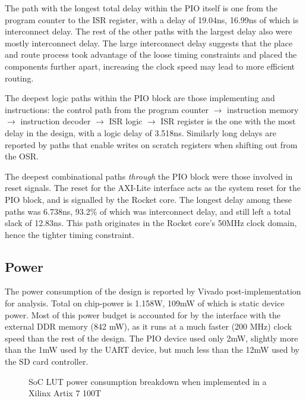 The path with the longest total delay within the PIO itself is one from the program counter to the ISR register, with a delay of 19.04ns, 16.99ns of which is interconnect delay. The rest of the other paths with the largest delay also were mostly interconnect delay. The large interconnect delay suggests that the place and route process took advantage of the loose timing constraints and placed the components further apart, increasing the clock speed may lead to more efficient routing.

The deepest logic paths within the PIO block are those implementing  and  instructions: the control path from the program counter $\rightarrow$ instruction memory $\rightarrow$ instruction decoder $\rightarrow$ ISR logic $\rightarrow$ ISR register is the one with the most delay in the design, with a logic delay of 3.518ns. Similarly long delays are reported by paths that enable writes on scratch registers when shifting out from the OSR.

The deepest combinational paths \textit{through} the PIO block were those involved in reset signals. The reset for the AXI-Lite interface acts as the system reset for the PIO block, and is signalled by the Rocket core. The longest delay among these paths was 6.738ns, 93.2\% of which was interconnect delay, and still left a total slack of 12.83ns. This path originates in the Rocket core's 50MHz clock domain, hence the tighter timing constraint.

\subsection{Power}

The power consumption of the design is reported by Vivado post-implementation for analysis. Total on chip-power is 1.158W, 109mW of which is static device power. Most of this power budget is accounted for by the interface with the external DDR memory (842 mW), as it runs at a much faster (200 MHz) clock speed than the rest of the design. The PIO device used only 2mW, slightly more than the 1mW used by the UART device, but much less than the 12mW used by the SD card controller.

\begin{figure}[H]
    \centering
    \caption{SoC LUT power consumption breakdown when implemented in a Xilinx Artix 7 100T}
    \label{fig:pie2}
\end{figure}


